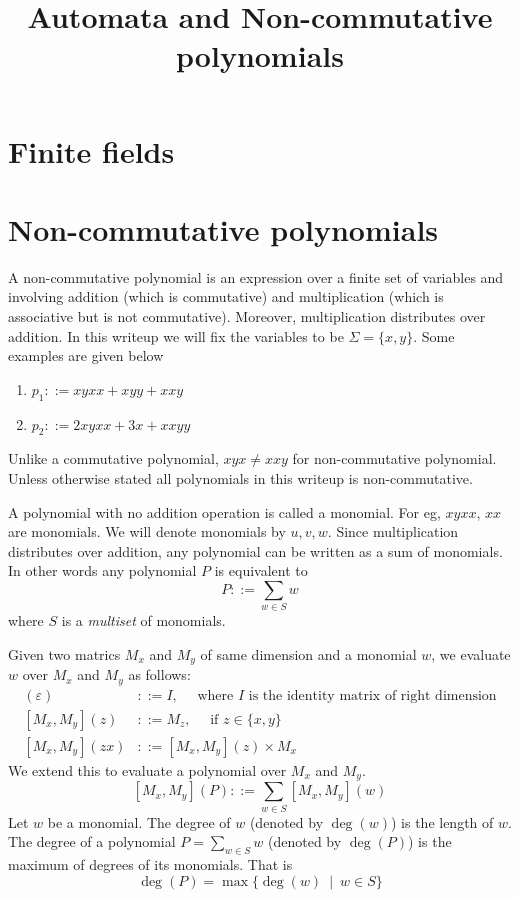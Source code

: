 \documentclass[english,course]{lecture}
\title{Automata and Non-commutative polynomials}
\newcommand{\Mxy}[1]{[M_x,M_y](#1)}
\newcommand{\degree}[1]{\deg(#1)}
\newcommand{\defs}{::=}
\begin{document}
\section{Finite fields}

\section{Non-commutative polynomials}
A non-commutative polynomial is an expression over a finite set of variables and involving addition (which is commutative) and multiplication (which is associative but is not commutative). Moreover, multiplication distributes over addition. In this writeup we will fix the variables to be $\Sigma = \{x,y\}$. Some examples are given below
\begin{enumerate}
\item $p_1 \defs xyxx + xyy + xxy$
\item $p_2 \defs 2xyxx + 3x + xxyy$
\end{enumerate}
Unlike a commutative polynomial, $xyx \neq xxy$ for non-commutative polynomial. Unless otherwise stated all polynomials in this writeup is non-commutative.

A polynomial with no addition operation is called a monomial. For eg, $xyxx$, $xx$ are monomials. We will denote monomials by $u, v, w$. Since multiplication distributes over addition, any polynomial can be written as a sum of monomials. In other words any polynomial $P$ is equivalent to 
\[
P \defs \sum_{w \in S} w
\]
where $S$ is a \emph{multiset} of monomials.

Given two matrics $M_x$ and $M_y$ of same dimension and a monomial $w$, we evaluate $w$ over $M_x$ and $M_y$ as follows:
\begin{align*}
\Mxy \varepsilon & \defs I, \quad \text{ where $I$ is the identity matrix of right dimension}\\
\Mxy z & \defs M_z, \quad \text{   if $z \in \{x,y\}$} \\
\Mxy {zx} & \defs \Mxy z \times M_x
\end{align*}
We extend this to evaluate a polynomial over $M_x$ and $M_y$.
\[
\Mxy P \defs \sum_{w \in S} \Mxy w
\]
Let $w$ be a monomial. The degree of $w$ (denoted by $\degree w$) is the length of $w$. The degree of a polynomial $P=\sum_{w \in S} w$ (denoted by $\degree P$) is the maximum of degrees of its monomials. That is 
\[\degree P = \max \{\degree w \ \mid\ w \in S\}\]
\end{document}
